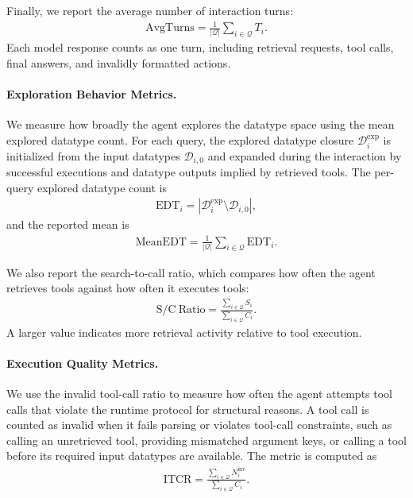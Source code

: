 Finally, we report the average number of interaction turns:
\begin{equation}
\begin{aligned}
\mathrm{AvgTurns} = \frac{1}{|\mathcal{Q}|}\sum_{i \in \mathcal{Q}} T_i.
\end{aligned}
\end{equation}
Each model response counts as one turn, including retrieval requests, tool calls, final answers, and invalidly formatted actions.

\paragraph{Exploration Behavior Metrics.}
We measure how broadly the agent explores the datatype space using the mean explored datatype count. 
For each query, the explored datatype closure $\mathcal{D}_i^{\mathrm{exp}}$ is initialized from the input datatypes $\mathcal{D}_{i,0}$ and expanded during the interaction by successful executions and datatype outputs implied by retrieved tools. 
The per-query explored datatype count is
\begin{equation}
\begin{aligned}
\mathrm{EDT}_i = |\mathcal{D}_i^{\mathrm{exp}} \setminus \mathcal{D}_{i,0}|,
\end{aligned}
\end{equation}
and the reported mean is
\begin{equation}
\begin{aligned}
\mathrm{MeanEDT} = \frac{1}{|\mathcal{Q}|}\sum_{i \in \mathcal{Q}} \mathrm{EDT}_i.
\end{aligned}
\end{equation}

We also report the search-to-call ratio, which compares how often the agent retrieves tools against how often it executes tools:
\begin{equation}
\begin{aligned}
\mathrm{S/C\ Ratio} = \frac{\sum_{i \in \mathcal{Q}} S_i}{\sum_{i \in \mathcal{Q}} C_i}.
\end{aligned}
\end{equation}
A larger value indicates more retrieval activity relative to tool execution.

\paragraph{Execution Quality Metrics.}
We use the invalid tool-call ratio to measure how often the agent attempts tool calls that violate the runtime protocol for structural reasons.
A tool call is counted as invalid when it fails parsing or violates tool-call constraints, such as calling an unretrieved tool, providing mismatched argument keys, or calling a tool before its required input datatypes are available.
The metric is computed as
\begin{equation}
\begin{aligned}
\mathrm{ITCR} = \frac{\sum_{i \in \mathcal{Q}} N_i^{\mathrm{inv}}}{\sum_{i \in \mathcal{Q}} C_i}.
\end{aligned}
\end{equation}

